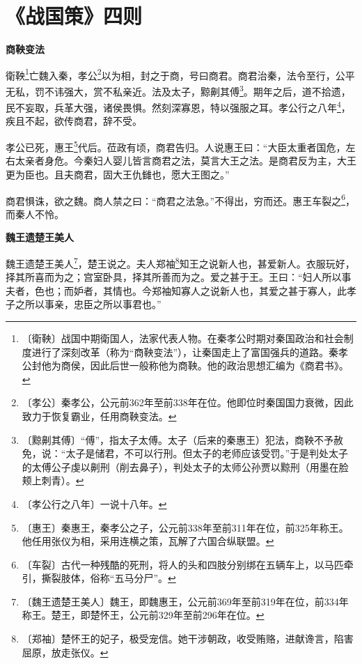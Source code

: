\documentclass[12pt,UTF-8,openany,a4]{ctexbook}
\begin{document}
\chapter{《战国策》四则}

\begin{large}
    
    \begin{center}{\Large\textbf{商鞅变法}}\end{center}
    
    衛鞅\footnote{〔衛鞅〕\yiwen 战国中期衛国人，法家代表人物。在秦孝公时期对秦国政治和社会制度进行了深刻改革（称为“商鞅变法”），让秦国走上了富国强兵的道路。秦孝公封他为商侯，因此后世一般称他为商鞅。他的政治思想汇编为《商君书》。}亡魏入秦，孝公\footnote{〔孝公〕\yiwen 秦孝公，公元前362年至前338年在位。他即位时秦国国力衰微，因此致力于恢复霸业，任用商鞅变法。}以为相，封之于商，号曰商君。商君治秦，法令至行，公平无私，罚不讳强大，赏不私亲近。法及太子，黥劓其傅\footnote{〔黥劓其傅〕\yiwen “傅”，指太子太傅。太子（后来的秦惠王）犯法，商鞅不予赦免，说：“太子是储君，不可以行刑。但太子的老师应该受罚。”于是判处太子的太傅公子虔以劓刑（削去鼻子），判处太子的太师公孙贾以黥刑（用墨在脸颊上刺青）。}。期年之后，道不拾遗，民不妄取，兵革大强，诸侯畏惧。然刻深寡恩，特以强服之耳。孝公行之八年\footnote{〔孝公行之八年〕\yiwen 一说十八年。}，疾且不起，欲传商君，辞不受。
    
    孝公已死，惠王\footnote{〔惠王〕\yiwen 秦惠王，秦孝公之子，公元前338年至前311年在位，前325年称王。他任用张仪为相，采用连横之策，瓦解了六国合纵联盟。}代后。莅政有顷，商君告归。人说惠王曰：“大臣太重者国危，左右太亲者身危。今秦妇人婴儿皆言商君之法，莫言大王之法。是商君反为主，大王更为臣也。且夫商君，固大王仇雠也，愿大王图之。”
    
    商君惧诛，欲之魏。商人禁之曰：“商君之法急。”不得出，穷而还。惠王车裂之\footnote{〔车裂〕\yiwen 古代一种残酷的死刑，将人的头和四肢分别绑在五辆车上，以马匹牵引，撕裂肢体，俗称“五马分尸”。}，而秦人不怜。
    
    \begin{center}{\Large\textbf{魏王遗楚王美人}}\end{center}
    
    魏王遗楚王美人\footnote{〔魏王遗楚王美人〕\yiwen 魏王，即魏惠王，公元前369年至前319年在位，前334年称王。楚王，即楚怀王，公元前329年至前296年在位。}，楚王说之。夫人郑袖\footnote{〔郑袖〕\yiwen 楚怀王的妃子，极受宠信。她干涉朝政，收受贿赂，进献谗言，陷害屈原，放走张仪。}知王之说新人也，甚爱新人。衣服玩好，择其所喜而为之；宫室卧具，择其所善而为之。爱之甚于王。王曰：“妇人所以事夫者，色也；而妒者，其情也。今郑袖知寡人之说新人也，其爱之甚于寡人，此孝子之所以事亲，忠臣之所以事君也。”
    

\end{large}
\end{document}
